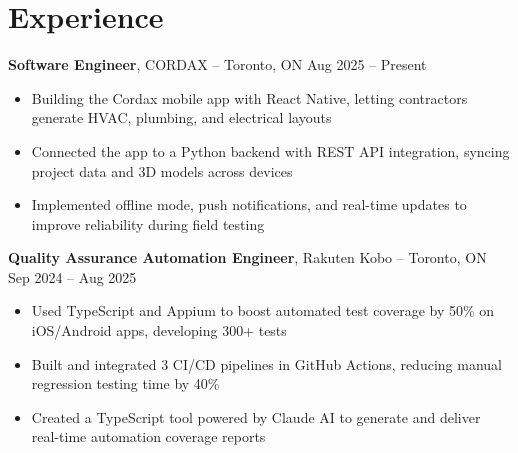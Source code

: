 

\section*{Experience}
\textbf{Software Engineer}, {CORDAX} -- Toronto, ON \hfill Aug 2025 -- Present \\
\vspace{-5pt}
\begin{itemize}
  \item Building the Cordax mobile app with React Native, letting contractors generate HVAC, plumbing, and electrical layouts
  \item Connected the app to a Python backend with REST API integration, syncing project data and 3D models across devices
  \item Implemented offline mode, push notifications, and real-time updates to improve reliability during field testing
\end{itemize}


\textbf{Quality Assurance Automation Engineer}, {Rakuten Kobo} -- Toronto, ON \hfill Sep 2024 -- Aug 2025 \\
\vspace{-5pt}
\begin{itemize}
  \item Used TypeScript and Appium to boost automated test coverage by 50\% on iOS/Android apps, developing 300+ tests
  \item Built and integrated 3 CI/CD pipelines in GitHub Actions, reducing manual regression testing time by 40\%
  \item Created a TypeScript tool powered by Claude AI to generate and deliver real-time automation coverage reports
\end{itemize}

